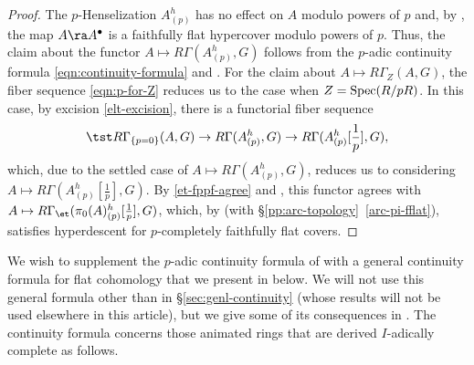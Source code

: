 \begin{proof}
The $p$-Henselization $A^h_{(p)}$ has no effect on $A$ modulo powers of $p$ and, by , the map $A \ra A^\bullet$ is a faithfully flat hypercover modulo powers of $p$. %
Thus, the claim about the functor $A\mapsto R\Gamma(A^h_{(p)}, G)$ follows from the $p$-adic continuity formula \eqref{eqn:continuity-formula} and . %
For the claim about $A\mapsto R\Gamma_Z(A, G)$, the fiber sequence \eqref{eqn:p-for-Z} reduces us to the case when $Z = \operatorname{Spec}(R/pR)$. In this case, by excision \eqref{elt-excision}, there is a functorial fiber sequence
\[
\tst R\Gamma_{\{p=0\}}(A,G)\to R\Gamma(A^h_{(p)},G)\to R\Gamma(A^h_{(p)}[\frac 1p],G),
\]
which, due to the settled case of $A\mapsto R\Gamma(A^h_{(p)}, G)$, reduces us to considering $A\mapsto R\Gamma(A^h_{(p)}[\frac 1p],G)$. By \eqref{et-fppf-agree} and , this functor agrees with $A\mapsto R\Gamma_\et(\pi_0(A)^h_{(p)}[\frac 1p],G)$, which, by  (with \S\ref{pp:arc-topology}~\ref{arc-pi-fflat}), satisfies hyperdescent for $p$-completely faithfully flat covers. %
\end{proof}



















 \label{sec:genl-continuity}




We wish to supplement the $p$-adic continuity formula of  with a general continuity formula for flat cohomology that we present in  below. We will not use this general formula other than in \S\ref{sec:genl-continuity} (whose results will not be used elsewhere in this article), but we give some of its consequences in . The continuity formula concerns those animated rings that are derived $I$-adically complete as follows.


